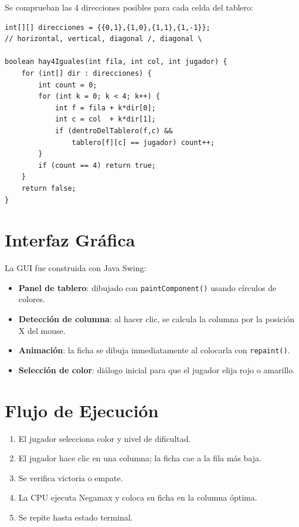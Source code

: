 \documentclass[12pt,a4paper]{article}
\begin{document}
Se comprueban las 4 direcciones posibles para cada celda del tablero:

\begin{lstlisting}
int[][] direcciones = {{0,1},{1,0},{1,1},{1,-1}};
// horizontal, vertical, diagonal /, diagonal \

boolean hay4Iguales(int fila, int col, int jugador) {
    for (int[] dir : direcciones) {
        int count = 0;
        for (int k = 0; k < 4; k++) {
            int f = fila + k*dir[0];
            int c = col  + k*dir[1];
            if (dentroDelTablero(f,c) &&
                tablero[f][c] == jugador) count++;
        }
        if (count == 4) return true;
    }
    return false;
}
\end{lstlisting}

\section{Interfaz Gráfica}

La GUI fue construida con Java Swing:
\begin{itemize}
  \item \textbf{Panel de tablero}: dibujado con \texttt{paintComponent()} usando círculos de colores.
  \item \textbf{Detección de columna}: al hacer clic, se calcula la columna por la posición X del mouse.
  \item \textbf{Animación}: la ficha se dibuja inmediatamente al colocarla con \texttt{repaint()}.
  \item \textbf{Selección de color}: diálogo inicial para que el jugador elija rojo o amarillo.
\end{itemize}

\section{Flujo de Ejecución}

\begin{enumerate}
  \item El jugador selecciona color y nivel de dificultad.
  \item El jugador hace clic en una columna; la ficha cae a la fila más baja.
  \item Se verifica victoria o empate.
  \item La CPU ejecuta Negamax y coloca su ficha en la columna óptima.
  \item Se repite hasta estado terminal.
\end{enumerate}
\end{document}
